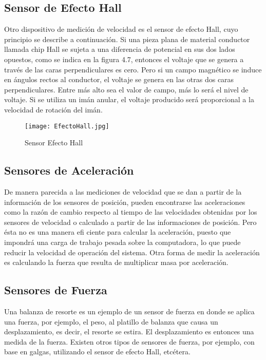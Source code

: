 \subsection*{\quad\textbf{Sensor de Efecto Hall}}
Otro dispositivo de medición de velocidad es el sensor de efecto Hall, cuyo principio se describe a continuación. Si una pieza plana de material conductor llamada chip Hall se sujeta a una diferencia de potencial en sus dos lados opuestos, como se indica en la figura 4.7, entonces el voltaje que se genera a través de las caras perpendiculares es cero. Pero si un campo magnético se induce en ángulos rectos al conductor, el voltaje se genera en las otras dos caras perpendiculares. Entre más alto sea el valor de campo, más lo será el nivel de voltaje. Si se utiliza un imán anular, el voltaje producido será proporcional a la velocidad de rotación del imán.

\begin{figure}[h]
	\centering
	\texttt{[image: EfectoHall.jpg]} %
	\caption{Sensor Efecto Hall}
	\label{fig:ejemplo5}
\end{figure}


\subsection{\textbf{Sensores de Aceleración}}
De manera parecida a las mediciones de velocidad que se dan a partir de la información de los sensores de posición, pueden encontrarse las aceleraciones como la razón de cambio respecto al tiempo de las velocidades obtenidas por los sensores de velocidad o calculado a partir de las informaciones de posición. Pero ésta no es una manera efi ciente para calcular
la aceleración, puesto que impondrá una carga de trabajo pesada sobre la computadora, lo que puede reducir la velocidad de operación del sistema. Otra forma de medir la aceleración es calculando la fuerza que resulta de multiplicar masa por aceleración.

\subsection{\textbf{Sensores de Fuerza}}
Una balanza de resorte es un ejemplo de un sensor de fuerza en donde se aplica una fuerza, por ejemplo, el peso, al platillo de balanza que causa un desplazamiento, es decir, el resorte se estira. El desplazamiento es entonces una medida de la fuerza. Existen otros tipos de sensores de fuerza, por ejemplo, con base en galgas, utilizando el sensor de efecto Hall, etcétera.

